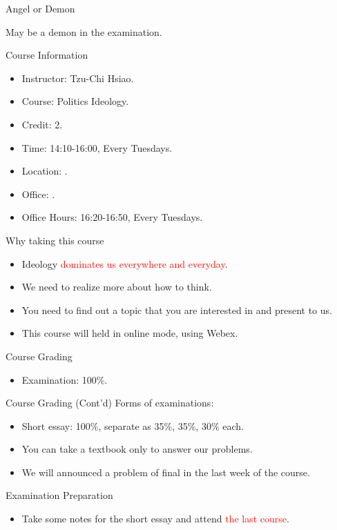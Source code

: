 \documentclass{beamer}
\begin{document}
\begin{frame}{Angel or Demon}
\begin{minipage}{0.4\textwidth}
\begin{center}
\end{center}
\begin{center}
May be a demon in the examination.
\end{center}
\end{minipage}
\end{frame}
\begin{frame}{Course Information}
\begin{itemize}
\item Instructor: Tzu-Chi Hsiao.
\item Course: Politics Ideology.
\item Credit: 2.
\item Time: 14:10-16:00, Every Tuesdays.
\item Location: . 
\item Office: .
\item Office Hours: 16:20-16:50, Every Tuesdays.
\end{itemize}
\end{frame}
\begin{frame}{Why taking this course}
\begin{itemize}
\item Ideology \textcolor{red}{dominates us everywhere and everyday}.
\item We need to realize more about how to think.
\item You need to find out a topic that you are interested in and present to us.
\item This course will held in online mode, using Webex.
\end{itemize}
\end{frame}
\begin{frame}{Course Grading}
\begin{itemize}
\item Examination: 100\%.
\end{itemize}
\end{frame}
\begin{frame}{Course Grading (Cont'd)}
Forms of examinations:
\begin{itemize}
\item Short essay: 100\%, separate as 35\%, 35\%, 30\% each.
\item You can take a textbook only to answer our problems.
\item We will announced a problem of final in the last week of the course.
\end{itemize}
\end{frame}
\begin{frame}{Examination Preparation}
\begin{itemize}
\item Take some notes for the short essay and attend \textcolor{red}{the last course}.
\end{itemize}
\end{frame}
\end{document}
